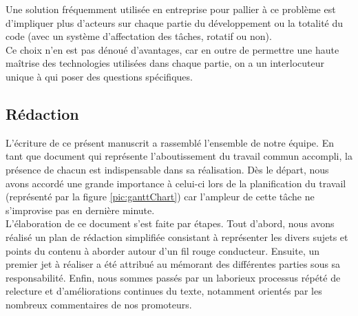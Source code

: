 Une solution fréquemment utilisée en entreprise pour pallier à ce problème est d'impliquer plus d'acteurs sur chaque partie du développement ou la totalité du code (avec un système d'affectation des tâches, rotatif ou non). \\

Ce choix n'en est pas dénoué d'avantages, car en outre de permettre une haute maîtrise des technologies utilisées dans chaque partie, on a un interlocuteur unique à qui poser des questions spécifiques.



\subsection*{Rédaction}




L'écriture de ce présent manuscrit a rassemblé l'ensemble de notre équipe. En tant que document qui représente l'aboutissement du travail commun accompli, la présence de chacun est indispensable dans sa réalisation. Dès le départ, nous avons accordé une grande importance à celui-ci lors de la planification du travail (représenté par la figure \ref{pic:ganttChart}) car l'ampleur de cette tâche ne s'improvise pas en dernière minute. \\

L'élaboration de ce document s'est faite par étapes. Tout d'abord, nous avons réalisé un plan de rédaction simplifiée consistant à représenter les divers sujets et points du contenu à aborder autour d'un fil rouge conducteur. Ensuite, un premier jet à réaliser a été attribué au mémorant des différentes parties sous sa responsabilité. Enfin, nous sommes passés par un laborieux processus répété de relecture et d'améliorations continues du texte, notamment orientés par les nombreux commentaires de nos promoteurs.